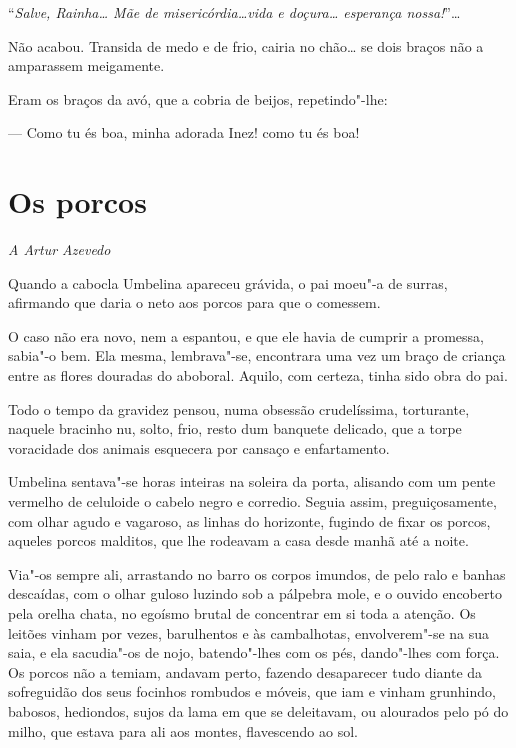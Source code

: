 ``\emph{Salve, Rainha\ldots{} Mãe de misericórdia\ldots{}vida e doçura\ldots{}
esperança nossa!}''\ldots{}

Não acabou. Transida de medo e de frio, cairia no chão\ldots{} se dois braços
não a amparassem meigamente.

Eram os braços da avó, que a cobria de beijos, repetindo"-lhe:

--- Como tu és boa, minha adorada Inez! como tu és boa!

\chapter{Os porcos}

\hfill{}\emph{A Artur Azevedo}

\bigskip

\noindent{}Quando a cabocla Umbelina apareceu grávida, o pai moeu"-a de surras,
afirmando que daria o neto aos porcos para que o comessem.

O caso não era novo, nem a espantou, e que ele havia de cumprir a
promessa, sabia"-o bem. Ela mesma, lembrava"-se, encontrara uma vez um
braço de criança entre as flores douradas do aboboral. Aquilo, com
certeza, tinha sido obra do pai.

Todo o tempo da gravidez pensou, numa obsessão crudelíssima, torturante,
naquele bracinho nu, solto, frio, resto dum banquete delicado, que a
torpe voracidade dos animais esquecera por cansaço e enfartamento.

Umbelina sentava"-se horas inteiras na soleira da porta, alisando com um
pente vermelho de celuloide o cabelo negro e corredio. Seguia assim,
preguiçosamente, com olhar agudo e vagaroso, as linhas do horizonte,
fugindo de fixar os porcos, aqueles porcos malditos, que lhe rodeavam a
casa desde manhã até a noite.

Via"-os sempre ali, arrastando no barro os corpos imundos, de pelo ralo e
banhas descaídas, com o olhar guloso luzindo sob a pálpebra mole, e o
ouvido encoberto pela orelha chata, no egoísmo brutal de concentrar em
si toda a atenção. Os leitões vinham por vezes, barulhentos e às
cambalhotas, envolverem"-se na sua saia, e ela sacudia"-os de nojo,
batendo"-lhes com os pés, dando"-lhes com força. Os porcos não a temiam,
andavam perto, fazendo desaparecer tudo diante da sofreguidão dos seus
focinhos rombudos e móveis, que iam e vinham grunhindo, babosos,
hediondos, sujos da lama em que se deleitavam, ou alourados pelo pó do
milho, que estava para ali aos montes, flavescendo ao sol.

